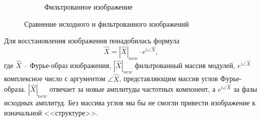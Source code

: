 \documentclass[a4paper, 12pt]{article}
\begin{document}
\begin{figure}[H]
\begin{subfigure}{0.45\textwidth}
            \caption{Фильтрованное изображение}
            \label{fig:new}
        \end{subfigure}
        \caption{Сравнение исходного и фильтрованного изображений}
        \label{fig:oldnew}
    \end{figure}


    Для восстановления изображения понадобилась формула
    $$
    \hat{X}=|\hat{X}|_{new}\cdot e^{i\angle\hat{X}},
    $$
    где $\hat{X}$ -- Фурье-образ изображения, $|\hat{X}|_{new}$ фильтрованный массив модулей,
    $e^{i\angle\hat{X}}$ комплексное число с аргументом $\angle\hat{X}$, представляющим массив углов
    Фурье-образа. $|\hat{X}|_{new}$ отвечает за новые амплитуды частотных компонент, а $e^{i\angle\hat{X}}$
    за фазы исходных амплитуд. Без массива углов мы бы не смогли привести изображение к изначальной <<структуре>>.
\end{document}
